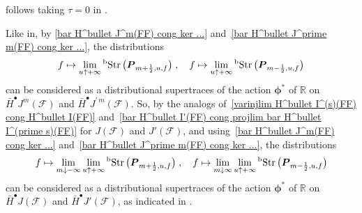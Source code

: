\documentclass{memo-l}
\theoremstyle{plain}
\theoremstyle{definition}
\theoremstyle{remark}
\newcommand{\R}{\mathbb{R}}
\newcommand{\FF}{\mathcal{F}}
\newcommand{\bfP}{\boldsymbol{P}}
\newcommand{\bfphi}{\boldsymbol{\phi}}
\newcommand{\Str}{\operatorname{Str}}
\newcommand{\bStr}{{}^{\text{\rm b}}\!\Str}
\numberwithin{section}{chapter}
\numberwithin{equation}{section}%
\begin{document}
 follows taking $\tau=0$ in .

Like in\cite{AlvKordy2002,AlvKordyLeichtnam2020}, by \eqref{bar H^bullet J^m(FF) cong ker ...} and~\eqref{bar H^bullet J^prime m(FF) cong ker ...}, the distributions
\[
f\mapsto\lim_{u\uparrow+\infty}\bStr\big(\bfP_{m+\frac12,u,f}\big)\;,\quad 
f\mapsto\lim_{u\uparrow+\infty}\bStr\big(\bfP_{m-\frac12,u,f}\big)
\]
can be considered as a distributional supertraces of the action $\bfphi^*$ of $\R$ on $\bar H^\bullet J^m(\FF)$ and $\bar H^\bullet J^{\prime\,m}(\FF)$. So, by the analogs of~\eqref{varinjlim H^bullet I^(s)(FF) cong H^bullet I(FF)} and~\eqref{bar H^bullet I'(FF) cong projlim bar H^bullet I^(prime s)(FF)} for $J(\FF)$ and $J'(\FF)$, and using~\eqref{bar H^bullet J^m(FF) cong ker ...} and~\eqref{bar H^bullet J^prime m(FF) cong ker ...}, the distributions
\[
f\mapsto\lim_{m\downarrow-\infty}\lim_{u\uparrow+\infty}\bStr\big(\bfP_{m+\frac12,u,f}\big)\;,\quad 
f\mapsto\lim_{m\downarrow\infty}\lim_{u\uparrow+\infty}\bStr\big(\bfP_{m-\frac12,u,f}\big)
\]
can be considered as a distributional supertraces of the action $\bfphi^*$ of $\R$ on $\bar H^\bullet J(\FF)$ and $\bar H^\bullet J'(\FF)$, as indicated in .


%

\backmatter





\printindex
\end{document}
